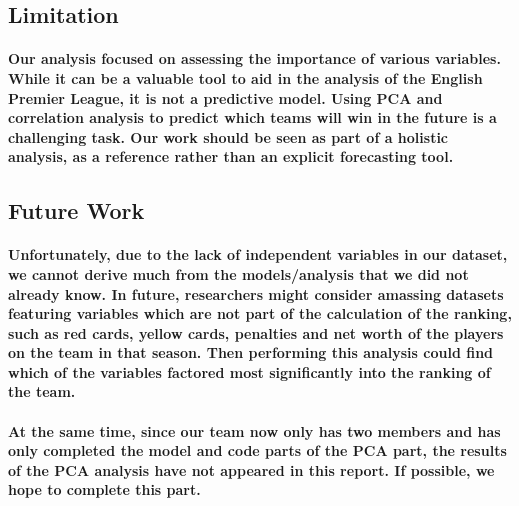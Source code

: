 \subsection{Limitation}
\paragraph{Our analysis focused on assessing the importance of various variables. While it can be a valuable tool to aid in the analysis of the English Premier League, it is not a predictive model. Using PCA and correlation analysis to predict which teams will win in the future is a challenging task. Our work should be seen as part of a holistic analysis, as a reference rather than an explicit forecasting tool.}
% 
% 
\subsection{Future Work}
\paragraph{Unfortunately, due to the lack of independent variables in our dataset, we cannot derive much from the models/analysis that we did not already know. In future, researchers might consider amassing datasets featuring variables which are not part of the calculation of the ranking, such as red cards, yellow cards, penalties and net worth of the players on the team in that season. Then performing this analysis could find which of the variables factored most significantly into the ranking of the team.}
\paragraph{At the same time, since our team now only has two members and has only completed the model and code parts of the PCA part, the results of the PCA analysis have not appeared in this report. If possible, we hope to complete this part.}